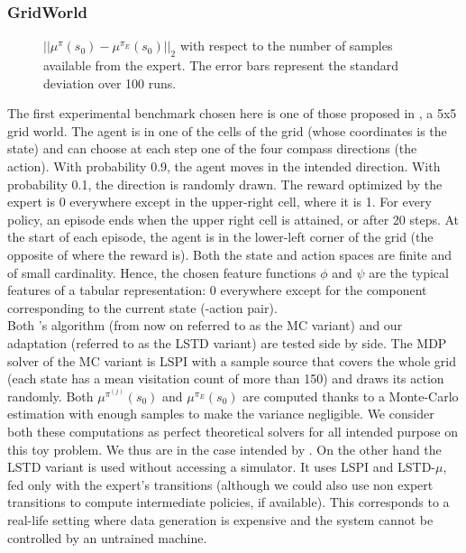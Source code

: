 \documentclass{llncs}
\begin{document}
\subsubsection{GridWorld}
\begin{figure}
\centering
\resizebox{\columnwidth}{!}{}
\caption{$||\mu^{\pi}(s_0) - \mu^{\pi_E}(s_0)||_2$ with respect to the number of samples available from the expert. The error bars represent the standard deviation over 100 runs.}
\label{fig:E}
\end{figure}
The first experimental benchmark chosen here is one of those proposed in \citep{ng2000algorithms}, a 5x5 grid world. The agent is in one of the cells of the grid (whose coordinates is the state) and can choose at each step one of the four compass directions (the action). With probability 0.9, the agent moves in the intended direction. With probability 0.1, the direction is randomly drawn. The reward optimized by the expert is 0 everywhere except in the upper-right cell, where it is 1. For every policy, an episode ends when the upper right cell is attained, or after 20 steps. At the start of each episode, the agent is in the lower-left corner of the grid (the opposite of where the reward is). Both the state and action spaces are finite and of small cardinality. Hence, the chosen feature functions $\phi$ and $\psi$ are the typical features of a tabular representation: 0 everywhere except for the component corresponding to the current state (-action pair).\\

Both \citet{abbeel2004apprenticeship}'s algorithm (from now on referred to as the MC variant) and our adaptation (referred to as the LSTD variant) are tested side by side. The MDP solver of the MC variant is LSPI with a sample source that covers the whole grid (each state has a mean visitation count of more than 150) and draws its action randomly. Both $\mu^{\pi^{(j)}}(s_0)$ and $\mu^{\pi_E}(s_0)$ are computed thanks to a Monte-Carlo estimation with enough samples to make the variance negligible. We consider both these computations as perfect theoretical solvers for all intended purpose on this toy problem. We thus are in the case intended by \citet{abbeel2004apprenticeship}. On the other hand the LSTD variant is used without accessing a simulator. It uses LSPI and LSTD-$\mu$, fed only with the expert's transitions (although we could also use non expert transitions  to compute intermediate policies, if available). This corresponds to a real-life setting where data generation is expensive and the system cannot be controlled by an untrained machine.\\
\end{document}
